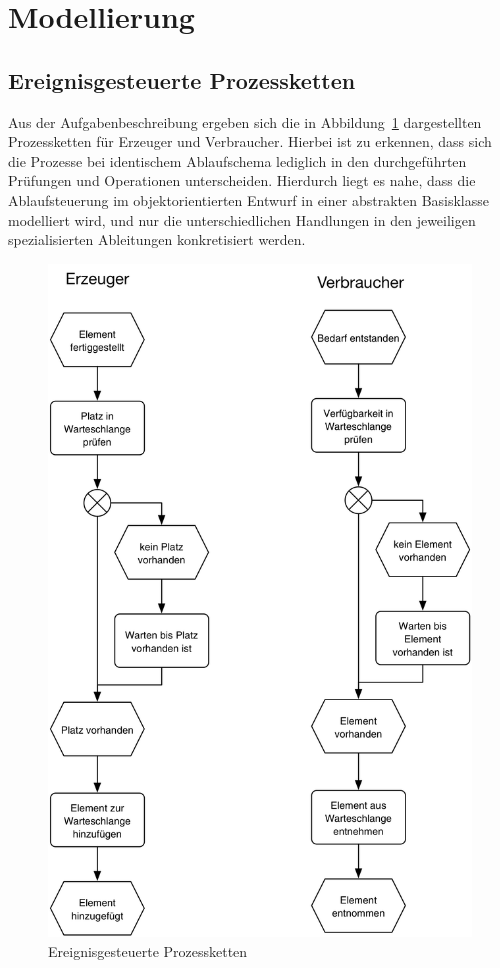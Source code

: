 \section{Modellierung} %
\label{sec:modellierung}

\subsection{Ereignisgesteuerte Prozessketten} %
\label{sub:ereignisgesteuerte_prozessketten}

Aus der Aufgabenbeschreibung ergeben sich die in Abbildung~\ref{fig:epk} dargestellten Prozessketten für Erzeuger und Verbraucher. Hierbei ist zu erkennen, dass sich die Prozesse bei identischem Ablaufschema lediglich in den  durchgeführten Prüfungen und Operationen unterscheiden. Hierdurch liegt es nahe, dass die Ablaufsteuerung im objektorientierten Entwurf in einer abstrakten Basisklasse modelliert wird, und nur die unterschiedlichen Handlungen in den jeweiligen spezialisierten Ableitungen konkretisiert werden.

\begin{figure}[H]
\begin{center}
\includegraphics[width=.5\textwidth]{Erzeuger-Verbraucher-EPK.jpg}
\caption{Ereignisgesteuerte Prozessketten}
\label{fig:epk}
\end{center}
\end{figure}


